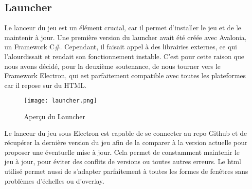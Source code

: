 \subsection{Launcher}

Le lanceur du jeu est un élément crucial, car il permet d'installer 
le jeu et de le maintenir à jour. Une première version du launcher avait 
été créée avec Avalonia, un Framework C\#. Cependant, il faisait appel à des 
librairies externes, ce qui l'alourdissait et rendait son fonctionnement instable. 
C'est pour cette raison que nous avons décidé, pour la deuxième soutenance, de nous 
tourner vers le Framework Electron, qui est parfaitement compatible avec toutes les 
plateformes car il repose sur du HTML.

\begin{figure}[hbt!]
    \centering
    \texttt{[image: launcher.png]}
    \caption{Aperçu du Launcher}
\end{figure}

Le lanceur du jeu sous Electron est capable de se connecter au repo Github et de récupérer la 
dernière version du jeu afin de la comparer à la version actuelle pour proposer une éventuelle 
mise à jour. Cela permet de constamment maintenir le jeu à jour, pour éviter des conflits de versions 
ou toutes autres erreurs. Le html utilisé permet aussi de s'adapter parfaitement à toutes les formes de 
fenêtres sans problèmes d'échelles ou d'overlay.
